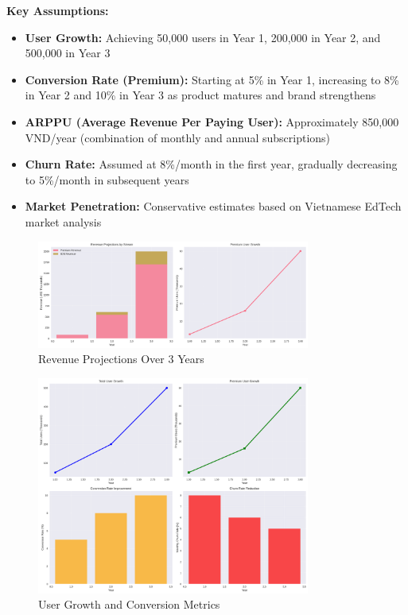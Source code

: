 \textbf{Key Assumptions:}
\begin{itemize}
    \item \textbf{User Growth:} Achieving 50,000 users in Year 1, 200,000 in Year 2, and 500,000 in Year 3
    \item \textbf{Conversion Rate (Premium):} Starting at 5\% in Year 1, increasing to 8\% in Year 2 and 10\% in Year 3 as product matures and brand strengthens
    \item \textbf{ARPPU (Average Revenue Per Paying User):} Approximately 850,000 VND/year (combination of monthly and annual subscriptions)
    \item \textbf{Churn Rate:} Assumed at 8\%/month in the first year, gradually decreasing to 5\%/month in subsequent years
    \item \textbf{Market Penetration:} Conservative estimates based on Vietnamese EdTech market analysis
\end{itemize}

\begin{figure}[h]
\centering
\includegraphics[width=0.8\textwidth]{graphics/revenue_projections.png}
\caption{Revenue Projections Over 3 Years}
\label{fig:revenue_projections}
\end{figure}

\begin{figure}[h]
\centering
\includegraphics[width=0.8\textwidth]{graphics/user_metrics.png}
\caption{User Growth and Conversion Metrics}
\label{fig:user_metrics}
\end{figure}


